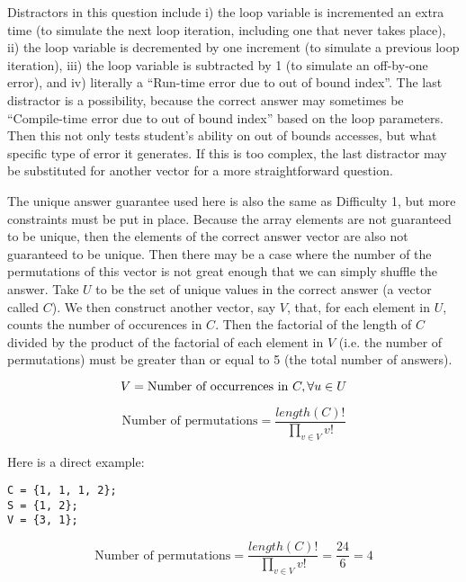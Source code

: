 \documentclass{article}
\begin{document}
Distractors in this question include i) the loop variable is incremented an extra time (to simulate the next loop iteration, including one that never takes place), ii) the loop variable is decremented by one increment (to simulate a previous loop iteration), iii) the loop variable is subtracted by 1 (to simulate an off-by-one error), and iv) literally a ``Run-time error due to out of bound index''.
The last distractor is a possibility, because the correct answer may sometimes be ``Compile-time error due to out of bound index'' based on the loop parameters. Then this not only tests 
student's ability on out of bounds accesses, but what specific type of error it generates. If this is too complex, the last distractor may be substituted for another vector for a more straightforward
question.

The unique answer guarantee used here is also the same as Difficulty 1, but more constraints must be put in place. Because the array elements are not guaranteed to be unique, then the
elements of the correct answer vector are also not guaranteed to be unique. Then there may be a case where the number of the permutations of this vector is not great enough that we can simply shuffle 
the answer. Take $ U $ to be the set of unique values in the correct answer (a vector called $ C $). We then construct another vector, say $ V $, that, for each element in $ U $, counts the number of occurences in $ C $.  Then the factorial of the length of $ C $ divided by the product of the factorial of each element in $ V $ 
 (i.e. the number of permutations) must be greater than or equal to 5 (the total number of answers).

\begin{equation*}
V = \textrm{Number of occurrences in } C, \forall \- u \in U
\end{equation*}

\begin{equation*}
\textrm{Number of permutations} = \frac{length(C)!}{\displaystyle \prod_{v \in V} v!}
\end{equation*}

\noindent Here is a direct example:

\begin{Verbatim}
C = {1, 1, 1, 2};
S = {1, 2}; 
V = {3, 1};
\end{Verbatim}
\begin{equation*}
\textrm{Number of permutations} = \frac{length(C)!}{\displaystyle \prod_{v \in V} v!} = \frac{24}{6} = 4
\end{equation*}
\end{document}
